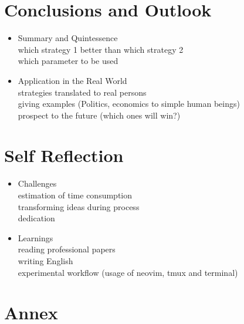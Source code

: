 \documentclass{article}
\begin{document}
\begin{itemize}
\end{itemize}


\section{Conclusions and Outlook}
\begin{itemize}

	\item Summary and Quintessence\\
		which strategy 1 better than which strategy 2\\
		which parameter to be used\\

	\item Application in the Real World\\
		strategies translated to real persons\\
		giving examples (Politics, economics to simple human beings)\\
		prospect to the future (which ones will win?)

\end{itemize}

\section{Self Reflection}
\begin{itemize}

	\item Challenges\\
		estimation of time consumption\\
		transforming ideas during process\\
		dedication

	\item Learnings\\
		reading professional papers\\
		writing English\\
		experimental workflow (usage of neovim, tmux and terminal)

\end{itemize}

\section{Annex}
\end{document}
